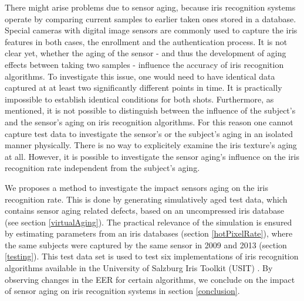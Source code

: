 \documentclass[10pt,twocolumn,letterpaper]{article}
\begin{document}
There might arise problems due to sensor aging, because iris recognition systems operate by comparing current samples to earlier taken ones stored in a database. Special cameras with digital image sensors are commonly used to capture the iris features in both cases, the enrollment and the authentication process. It is not clear yet, whether the aging of the sensor - and thus the development of aging effects between taking two samples - influence the accuracy of iris recognition algorithms. To investigate this issue, one would need to have identical data captured at at least two significantly different points in time. It is practically impossible to establish identical conditions for both shots. Furthermore, as mentioned, it is not possible to distinguish between the influence of the subject's and the sensor's aging on iris recognition algorithms. For this reason one cannot capture test data to investigate the sensor's or the subject's aging in an isolated manner physically. There is no way to explicitely examine the iris texture's aging at all. However, it is possible to investigate the sensor aging's influence on the iris recognition rate independent from the subject's aging.

We proposes a method to investigate the impact sensors aging on the iris recognition rate. This is done by generating simulatively aged test data, which contains sensor aging related defects, based on an uncompressed iris database \cite{iitd} (see section \ref{virtualAging}). The practical relevance of the simulation is ensured by estimating parameters from an iris databases (section \ref{hotPixelRate}), where the same subjects were captured by the same sensor in 2009 and 2013 (section \ref{testing}). This test data set is used to test six implementations of iris recognition algorithms available in the University of Salzburg Iris Toolkit (USIT) \cite{usit}. By observing changes in the EER for certain algorithms, we conclude on the impact of sensor aging on iris recognition systems in section \ref{conclusion}.
\end{document}
